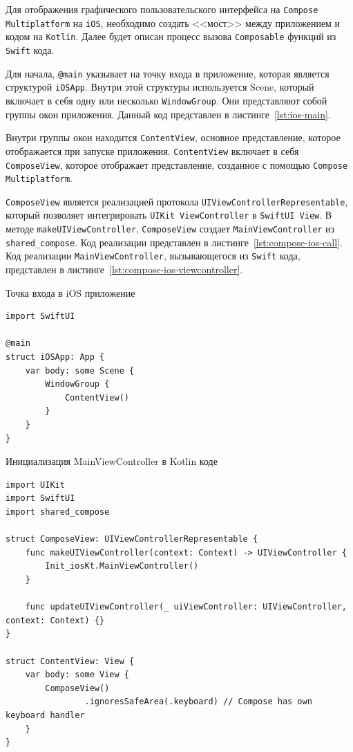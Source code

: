 \documentclass[14pt, russian]{scrartcl}
\begin{document}
Для отображения графического пользовательского интерфейса на \texttt{Compose Multiplatform} на \texttt{iOS}, необходимо создать <<мост>> между приложением и кодом на \texttt{Kotlin}. Далее будет описан процесс вызова \texttt{Composable} функций из \texttt{Swift} кода.

Для начала, \texttt{@main} указывает на точку входа в приложение, которая является структурой \texttt{iOSApp}. Внутри этой структуры используется Scene, который включает в себя одну или несколько \texttt{WindowGroup}. Они представляют собой группы окон приложения. Данный код представлен в листинге~\ref{lst:ios-main}.

Внутри группы окон находится \texttt{ContentView}, основное представление, которое отображается при запуске приложения. \texttt{ContentView} включает в себя \texttt{ComposeView}, которое отображает представление, созданное с помощью \texttt{Compose Multiplatform}.

\texttt{ComposeView} является реализацией протокола \texttt{UIViewControllerRepresentable}, который позволяет интегрировать \texttt{UIKit ViewController} в \texttt{SwiftUI View}. В методе \texttt{makeUIViewController}, \texttt{ComposeView} создает \texttt{MainViewController} из \texttt{shared\_compose}. Код реализации представлен в листинге~\ref{lst:compose-ios-call}. Код реализации \texttt{MainViewController}, вызывающегося из \texttt{Swift} кода, представлен в листинге~\ref{lst:compose-ios-viewcontroller}.

\begin{listing}[!htb]
\caption{Точка входа в iOS приложение}
\label{lst:ios-main}
\begin{verbatim}
import SwiftUI

@main
struct iOSApp: App {
    var body: some Scene {
        WindowGroup {
            ContentView()
        }
    }
}
\end{verbatim}
\end{listing}

\begin{listing}[!htb]
\caption{Инициализация MainViewController в Kotlin коде}
\label{lst:compose-ios-call}
\begin{verbatim}
import UIKit
import SwiftUI
import shared_compose

struct ComposeView: UIViewControllerRepresentable {
    func makeUIViewController(context: Context) -> UIViewController {
        Init_iosKt.MainViewController()
    }

    func updateUIViewController(_ uiViewController: UIViewController, context: Context) {}
}

struct ContentView: View {
    var body: some View {
        ComposeView()
                .ignoresSafeArea(.keyboard) // Compose has own keyboard handler
    }
}
\end{verbatim}
\end{listing}
\end{document}

